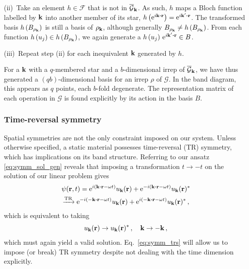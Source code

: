 (ii)~Take an element $h \in \mathcal{F}$ that is not in ${\overline{\mathcal{G}}}_{\vb{k}}$. As such, $h$ maps a Bloch function labelled by $\vb{k}$ into another member of its star, $h \left(\e^{i \vb{k}\vdot\vb{r}}\right) = \e^{i \vb{k}'\vdot\vb{r}}$. The transformed basis $h \left( B_{\rho_{\vb{k}}}\right)$ is still a basis of $\rho_{\vb{k}}$, although generally ${B_{\rho_{\vb{k}}}} \neq h \left( B_{\rho_{\vb{k}}}\right)$. From each function $h  \left(u_j\right) \in h \left( {B_{\rho_{\vb{k}}}}\right)$, we again generate a $h  \left(u_j\right)\, \e^{i \vb{k}'\vdot\vb{r}} \in B$.

(iii)~Repeat step (ii) for each inequivalent $\vb{k}$ generated by $h$. 

For a $\vb{k}$ with a $q$-membered star and a $b$-dimensional irrep of ${\overline{\mathcal{G}}}_{\vb{k}}$, we have thus generated a $(qb)$-dimensional basis for an irrep $\rho$ of $\mathcal{G}$. In the band diagram, this appears as $q$ points, each $b$-fold degenerate. The representation matrix of each operation in $\mathcal{G}$ is found explicitly by its action in the basis $B$.


\subsubsection{Time-reversal symmetry}

Spatial symmetries are not the only constraint imposed on our system. Unless otherwise specified, a static material possesses time-reversal (TR) symmetry, which has implications on its band structure. Referring to our ansatz \eqref{eq:symm_sol_gen} reveals that imposing a transformation $t \rightarrow -t$ on the solution of our linear problem gives
\begin{equation}
\begin{gathered}
\psi(\vb{r}, t) = \e^{i \left( \vb{k} \vdot \vb{r} - \omega t \right)} u_{\vb{k}}(\vb{r}) + \e^{-i \left( \vb{k} \vdot \vb{r} - \omega t \right)} u_{\vb{k}}(\vb{r})^* \\
\xrightarrow{\text{TR}} \e^{-i \left( -\vb{k} \vdot \vb{r} - \omega t \right)} u_{\vb{k}}(\vb{r}) + \e^{i \left( -\vb{k} \vdot \vb{r} - \omega t \right)} u_{\vb{k}}(\vb{r})^* \,,
\end{gathered}
\end{equation}
which is equivalent to taking
\begin{equation} \label{eq:symm_trs}
u_{\vb{k}}(\vb{r}) \rightarrow u_{\vb{k}}(\vb{r})^* \,, \quad \vb{k} \rightarrow -\vb{k} \,,
\end{equation}
which must again yield a valid solution. Eq.~\eqref{eq:symm_trs} will allow us to impose (or break) TR symmetry despite not dealing with the time dimension explicitly.  

